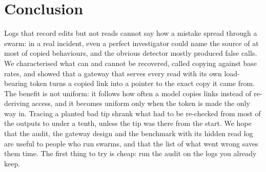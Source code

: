\section{Conclusion}\label{sec:conclusion}

Logs that record edits but not reads cannot say how a mistake spread through a swarm: in a real incident, even a perfect investigator could name the source of at most \bestTop{} of copied behaviours, and the obvious detector mostly produced false calls. We characterised what can and cannot be recovered, called copying against base rates, and showed that a gateway that serves every read with its own load-bearing token turns a copied link into a pointer to the exact copy it came from. The benefit is not uniform: it follows how often a model copies links instead of re-deriving access, and it becomes uniform only when the token is made the only way in. Tracing a planted bad tip shrank what had to be re-checked from most of the outputs to under a tenth, unless the tip was there from the start. We hope that the audit, the gateway design and the benchmark with its hidden read log are useful to people who run swarms, and that the list of what went wrong saves them time. The first thing to try is cheap: run the audit on the logs you already keep.
